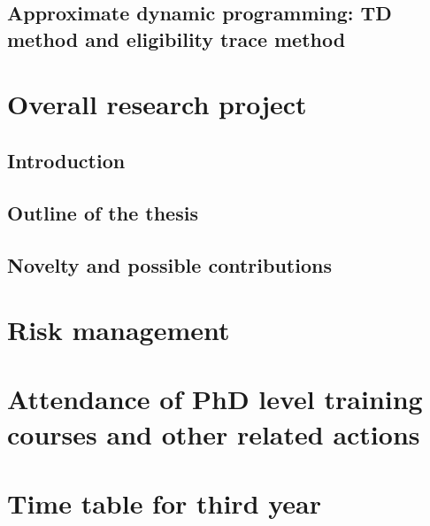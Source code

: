 \documentclass[12pt]{article}
\begin{document}
\subsection{Approximate dynamic programming: TD method and eligibility trace method}






\section{Overall research project}
\subsection{Introduction}
\subsection{Outline of the thesis}
\subsection{Novelty and possible contributions}
\section{Risk management}
\section{Attendance of PhD level training courses and other related actions}








\section{Time table for third year}




\newpage


\end{document}
